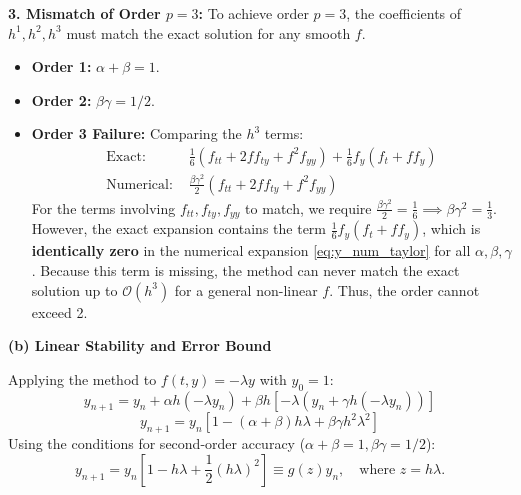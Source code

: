\begin{solution}
\textbf{3. Mismatch of Order $p=3$:}
To achieve order $p=3$, the coefficients of $h^1, h^2, h^3$ must match the exact solution for any smooth $f$.
\begin{itemize}
    \item \textbf{Order 1:} $\alpha + \beta = 1$.
    \item \textbf{Order 2:} $\beta \gamma = 1/2$.
    \item \textbf{Order 3 Failure:} Comparing the $h^3$ terms:
    \begin{align*}
        \text{Exact: } & \frac{1}{6} (f_{tt} + 2f f_{ty} + f^2 f_{yy}) + \frac{1}{6} f_y(f_t + f f_y) \\
        \text{Numerical: } & \frac{\beta \gamma^2}{2} (f_{tt} + 2f f_{ty} + f^2 f_{yy})
    \end{align*}
    For the terms involving $f_{tt}, f_{ty}, f_{yy}$ to match, we require $\frac{\beta \gamma^2}{2} = \frac{1}{6} \implies \beta \gamma^2 = \frac{1}{3}$.
    However, the exact expansion contains the term $\frac{1}{6} f_y(f_t + f f_y)$, which is \textbf{identically zero} in the numerical expansion \eqref{eq:y_num_taylor} for all $\alpha, \beta, \gamma$. Because this term is missing, the method can never match the exact solution up to $\mathcal{O}(h^3)$ for a general non-linear $f$. Thus, the order cannot exceed 2.
\end{itemize}

\textbf{(b) Linear Stability and Error Bound}

Applying the method to $f(t, y) = -\lambda y$ with $y_0 = 1$:
\[ y_{n+1} = y_n + \alpha h (-\lambda y_n) + \beta h [-\lambda (y_n + \gamma h (-\lambda y_n))] \]
\[ y_{n+1} = y_n [1 - (\alpha + \beta) h\lambda + \beta\gamma h^2 \lambda^2] \]
Using the conditions for second-order accuracy ($\alpha+\beta=1, \beta\gamma=1/2$):
\[ y_{n+1} = y_n [1 - h\lambda + \frac{1}{2} (h\lambda)^2] \equiv g(z) y_n, \quad \text{where } z = h\lambda. \]


\end{solution}
